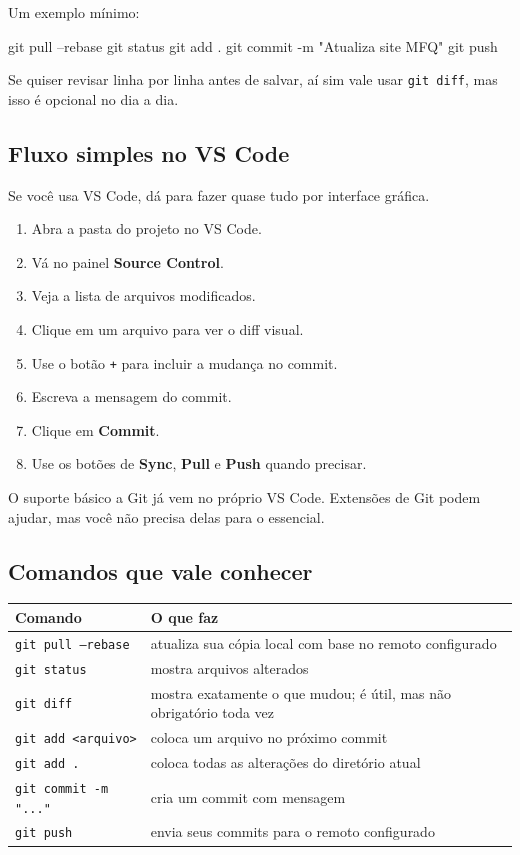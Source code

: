 \documentclass[11pt,a4paper]{article}
\begin{document}
Um exemplo mínimo:

\begin{terminal}
git pull --rebase
git status
git add .
git commit -m "Atualiza site MFQ"
git push
\end{terminal}

Se quiser revisar linha por linha antes de salvar, aí sim vale usar \texttt{git diff}, mas isso é opcional no dia a dia.

\subsection{Fluxo simples no VS Code}

Se você usa VS Code, dá para fazer quase tudo por interface gráfica.

\begin{enumerate}
  \item Abra a pasta do projeto no VS Code.
  \item Vá no painel \textbf{Source Control}.
  \item Veja a lista de arquivos modificados.
  \item Clique em um arquivo para ver o diff visual.
  \item Use o botão \texttt{+} para incluir a mudança no commit.
  \item Escreva a mensagem do commit.
  \item Clique em \textbf{Commit}.
  \item Use os botões de \textbf{Sync}, \textbf{Pull} e \textbf{Push} quando precisar.
\end{enumerate}

O suporte básico a Git já vem no próprio VS Code. Extensões de Git podem ajudar, mas você não precisa delas para o essencial.

\subsection{Comandos que vale conhecer}

\begin{longtable}{>{\raggedright\arraybackslash}p{} p{}}
\toprule
Comando & O que faz \\
\midrule
\endhead
\texttt{git pull --rebase} & atualiza sua cópia local com base no remoto configurado \\
\texttt{git status} & mostra arquivos alterados \\
\texttt{git diff} & mostra exatamente o que mudou; é útil, mas não obrigatório toda vez \\
\texttt{git add <arquivo>} & coloca um arquivo no próximo commit \\
\texttt{git add .} & coloca todas as alterações do diretório atual \\
\texttt{git commit -m "..."} & cria um commit com mensagem \\
\texttt{git push} & envia seus commits para o remoto configurado \\
\bottomrule
\end{longtable}
\end{document}
